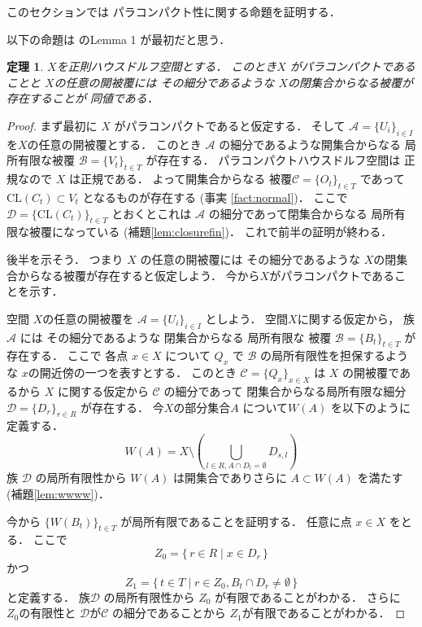 \documentclass[leqno, a4paper, 12pt]{jsarticle}
\newtheorem{thm}{定理}
\newcommand{\cl}{\mathrm{CL}}
\begin{document}
このセクションでは
パラコンパクト性に関する命題を証明する．



以下の命題は
\cite{MR0056905}
のLemma 1
が最初だと思う．
\begin{thm}\label{thm:hei}
$X$を正則ハウスドルフ空間とする．
このとき$X$
がパラコンパクトであることと
$X$の任意の開被覆には
その細分であるような
$X$の閉集合からなる被覆が存在することが
同値である．
\end{thm}
\begin{proof}
まず最初に
$X$
がパラコンパクトであると仮定する．
そして
$\mathcal{A}=\{U_{i}\}_{i\in I}$
を$X$の任意の開被覆とする．
このとき
$\mathcal{A}$
の細分であるような開集合からなる
局所有限な被覆
$\mathcal{B}=\{V_{t}\}_{t\in T}$
が存在する．
パラコンパクトハウスドルフ空間は
正規なので
$X$
は正規である．
よって開集合からなる
被覆$\mathcal{C}=\{O_{t}\}_{t\in T}$
であって$\cl(C_{t})\subset V_{t}$
となるものが存在する
(事実
\ref{fact:normal})．
ここで
$\mathcal{D}=\{\cl(C_{t})\}_{t\in T}$
とおくとこれは
$\mathcal{A}$
の細分であって閉集合からなる
局所有限な被覆になっている
(補題\ref{lem:closurefin})．
これで前半の証明が終わる．

後半を示そう．
つまり
$X$
の任意の開被覆には
その細分であるような
$X$の閉集合からなる被覆が存在すると仮定しよう．
今から$X$がパラコンパクトであることを示す．

空間
$X$の任意の開被覆を
$\mathcal{A}=\{U_{i}\}_{i\in I}$
としよう．
空間$X$に関する仮定から，
族
$\mathcal{A}$
には
その細分であるような
閉集合からなる
局所有限な
被覆
$\mathcal{B}=\{B_{t}\}_{t\in T}$
が存在する．
ここで
各点
$x\in X$
について
$Q_{x}$
で
$\mathcal{B}$
の局所有限性を担保するような
$x$の開近傍の一つを表すとする．
このとき
$\mathcal{C}=\{Q_{x}\}_{x\in X}$
は
$X$
の開被覆であるから
$X$
に関する仮定から
$\mathcal{C}$
の細分であって
閉集合からなる局所有限な細分
$\mathcal{D}=\{D_{r}\}_{r\in R}$
が存在する．
今$X$の部分集合$A$
について$W(A)$
を以下のように定義する．
\[
W(A)=X\setminus \left(\bigcup_{l\in R, 
A\cap D_{l}=\emptyset}D_{s, l}\right)
\]
族
$\mathcal{D}$
の局所有限性から
$W(A)$
は開集合でありさらに
$A\subset W(A)$
を満たす
(補題\ref{lem:wwww})．


今から
$\{W(B_{t})\}_{t\in T}$
が局所有限であることを証明する．
任意に点
$x\in X$
をとる．
ここで
\[
Z_{0}=\{\, r\in R\mid x\in D_{r} \, \}
\]
かつ
\[
Z_{1}=\{\, t\in T\mid r\in Z_{0}, B_{t}\cap D_{r}\neq \emptyset\, \}
\]
と定義する．
族$\mathcal{D}$
の局所有限性から
$Z_{0}$
が有限であることがわかる．
さらに
$Z_{0}$の有限性と
$\mathcal{D}$が$\mathcal{C}$
の細分であることから
$Z_{1}$が有限であることがわかる．


\end{proof}
\end{document}
